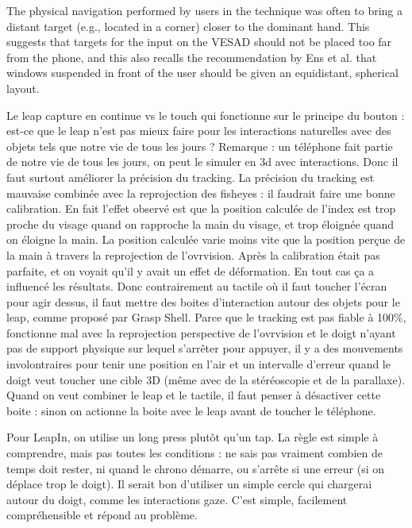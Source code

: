 The physical navigation performed by users in the  technique was often to bring a distant target (e.g., located in a corner) closer to the dominant hand. This suggests that targets for the input on the VESAD should not be placed too far from the phone, and this also recalls the recommendation by Ens et al. \cite{Ens2014} that windows suspended in front of the user should be given an equidistant, spherical layout.

Le leap capture en continue vs le touch qui fonctionne sur le principe du bouton : est-ce que le leap n'est pas mieux faire pour les interactions naturelles avec des objets tels que notre vie de tous les jours ? Remarque : un téléphone fait partie de notre vie de tous les jours, on peut le simuler en 3d avec interactions. Donc il faut surtout améliorer la précision du tracking.
La précision du tracking est mauvaise combinée avec la reprojection des fisheyes : il faudrait faire une bonne calibration. En fait l'effet observé est que la position calculée de l'index est trop proche du visage quand on rapproche la main du visage, et trop éloignée quand on éloigne la main. La position calculée varie moins vite que la position perçue de la main à travers la reprojection de l'ovrvision. Après la calibration était pas parfaite, et on voyait qu'il y avait un effet de déformation. En tout cas ça a influencé les résultats.
Donc contrairement au tactile où il faut toucher l'écran pour agir dessus, il faut mettre des boites d'interaction autour des objets pour le leap, comme proposé par Grasp Shell. Parce que le tracking est pas fiable à 100\%, fonctionne mal avec la reprojection perspective de l'ovrvision et le doigt n'ayant pas de support physique sur lequel s'arrêter pour appuyer, il y a des mouvements involontraires pour tenir une position en l'air et un intervalle d'erreur quand le doigt veut toucher une cible 3D (même avec de la stéréoscopie et de la parallaxe).
Quand on veut combiner le leap et le tactile, il faut penser à désactiver cette boite : sinon on actionne la boite avec le leap avant de toucher le téléphone.

Pour LeapIn, on utilise un long press plutôt qu'un tap. La règle est simple à comprendre, mais pas toutes les conditions : ne sais pas vraiment combien de temps doit rester, ni quand le chrono démarre, ou s'arrête si une erreur (si on déplace trop le doigt). Il serait bon d'utiliser un simple cercle qui chargerai autour du doigt, comme les interactions gaze. C'est simple, facilement compréhensible et répond au problème.

